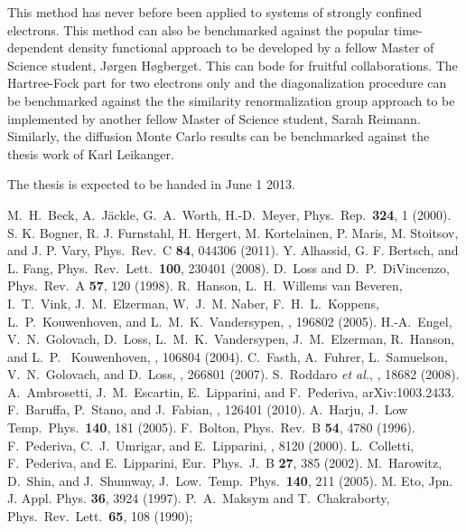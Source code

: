 \documentclass[twocolumn]{revtex4}
\begin{document}
This method has never before been applied to systems of strongly confined electrons. This method can also be benchmarked against the popular time-dependent density functional approach to be developed by a fellow
Master of Science student, J\o rgen H\o gberget. This can bode for fruitful collaborations.
The Hartree-Fock part for two electrons only and the diagonalization procedure can be benchmarked against the the similarity renormalization group approach to be implemented by another fellow Master of Science student, Sarah Reimann. Similarly, the diffusion Monte Carlo results can be benchmarked against the thesis work of Karl Leikanger.

The thesis is expected to be handed in June 1 2013.


\begin{thebibliography}{200}
 M.~H.~Beck, A.~J\"ackle, G.~A.~Worth, H.-D.~Meyer, Phys.~Rep.~{\bf 324}, 1 (2000).
 S. K. Bogner, R. J. Furnstahl, H. Hergert, M. Kortelainen, P. Maris, M. Stoitsov, and J. P. Vary, Phys.~Rev.~C {\bf 84}, 044306 (2011).
 Y. Alhassid, G. F. Bertsch, and L. Fang, Phys.~Rev.~Lett.~{\bf 100}, 230401 (2008).
 D.~Loss and D.~P.~DiVincenzo, Phys.~Rev.~A {\bf 57}, 120 (1998).
 R.~Hanson, L.~H.~Willems van Beveren, I.~T.~Vink, J.~M.~Elzerman, W.~J.~M. Naber, F.~H.~L.~Koppens, L.~P.~Kouwenhoven, and L.~M.~K.~Vandersypen, , 196802 (2005).
 H.-A.~Engel, V.~N.~Golovach, D.~Loss, L.~M.~K.~Vandersypen, J.~M.~Elzerman, R.~Hanson, and L.~P.~ Kouwenhoven, , 106804 (2004). 
 C.~Fasth, A.~Fuhrer, L.~Samuelson, V.~N.~Golovach, and D.~Loss, , 266801 (2007).
 S.~Roddaro {\em et al.}, , 18682 (2008).
A.~Ambrosetti, J.~M.~Escartin, E.~Lipparini, and F.~Pederiva, arXiv:1003.2433.
 F.~Baruffa, P.~Stano, and J.~Fabian, , 126401 (2010).
 A.~Harju, J.~Low Temp.~Phys.~{\bf 140}, 181 (2005).
 F.~Bolton, Phys.~Rev.~B {\bf 54}, 4780 (1996).
F.~Pederiva, C.~J.~Umrigar, and E.~Lipparini, , 8120 (2000).
L.~Colletti, F.~Pederiva, and  E.~Lipparini,  Eur.~Phys.~J.~B {\bf 27}, 
385 (2002).
 M.~Harowitz, D.~Shin, and J.~Shumway, J.~Low.~Temp.~Phys.~{\bf 140}, 211 (2005).
 M. Eto, Jpn. J. Appl. Phys. {\bf 36}, 3924 (1997).
 P.~A.~Maksym and T.~Chakraborty, Phys.~Rev.~Lett.~{\bf 65}, 108 (1990);

\end{thebibliography}
\end{document}

